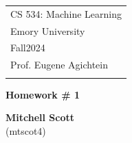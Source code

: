 \documentclass[a4paper,12pt]{article}
\theoremstyle{definition}
\theoremstyle{remark}
\begin{document}
	
	
	
	
	
	\thispagestyle{empty} %
	
	\begin{tabular}{p{15.5cm}} %
		{\large \sc CS 534:  Machine Learning} \\
		Emory University \\ Fall2024 \\ Prof. Eugene Agichtein \\
		\hline %
		\\
	\end{tabular} %
	
	\vspace*{0.3cm} %
	
	\begin{center} %
		{\Large \bf Homework \# 1} %
		\vspace{2mm}
		
		{\bf Mitchell Scott}\\ (mtscot4) %
		
	\end{center}  
	
	\vspace{0.4cm}
	
	
	
\end{document}
